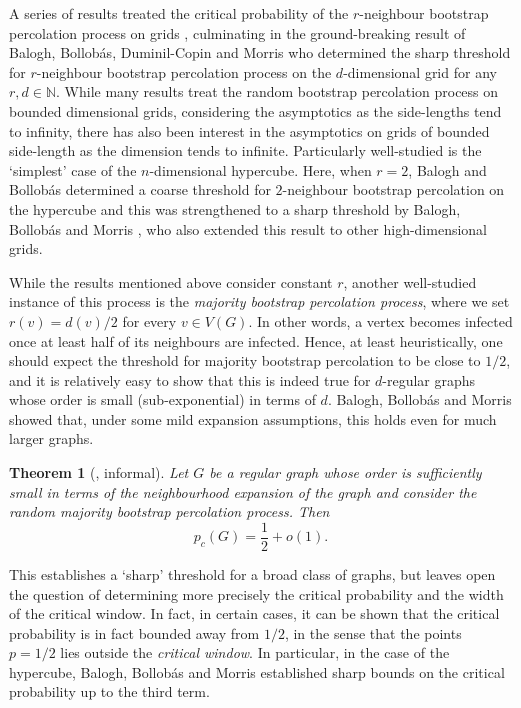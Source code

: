 \documentclass[reqno,a4paper,11pt]{amsart}
\newtheorem{theorem}{Theorem}[section]
\theoremstyle{definition}
\begin{document}
A series of results treated the critical probability of the $r$-neighbour bootstrap percolation process on grids \cite{AizenmanS2001Threshold,Balogh2003Sharp,Cerf1998Lattice3D,CerfManzo2002FinVol,GrHo08,HaMo19,holroyd2002sharp}, culminating in the ground-breaking result of Balogh, Bollobás, Duminil-Copin and Morris \cite{balogh2011Grid} who determined the sharp threshold for $r$-neighbour bootstrap percolation process on the $d$-dimensional grid for any $r, d \in \mathbb{N}$.
While many results treat the random bootstrap percolation process on bounded dimensional grids, considering the asymptotics as the side-lengths tend to infinity, there has also been interest in the asymptotics on grids of bounded side-length as the dimension tends to infinite.
Particularly well-studied is the `simplest' case of the $n$-dimensional hypercube.
Here, when $r=2$, Balogh and Bollobás \cite{BaBo06} determined a coarse threshold for $2$-neighbour bootstrap percolation on the hypercube and this was strengthened to a sharp threshold by Balogh, Bollobás and Morris \cite{BaBoMo2010HighDimGrid}, who also extended this result to other high-dimensional grids.

While the results mentioned above consider constant $r$, another well-studied instance of this process is the \emph{majority bootstrap percolation process}, where we set $r(v)=d(v)/2$ for every $v \in V(G)$.
In other words, a vertex becomes infected once at least half of its neighbours are infected.
Hence, at least heuristically, one should expect the threshold for majority bootstrap percolation to be close to $1/2$, and it is relatively easy to show that this is indeed true for $d$-regular graphs whose order is small (sub-exponential) in terms of $d$.
Balogh, Bollobás and Morris \cite{BaBoMo2009} showed that, under some mild expansion assumptions, this holds even for much larger graphs.

\begin{theorem}[{\cite[Theorem 2.2]{BaBoMo2009}}, informal]\label{thm:BaBoMogeneral}
  Let $G$ be a regular graph whose order is sufficiently small in terms of the neighbourhood expansion of the graph and consider the random majority bootstrap percolation process.
  Then
  \[
    p_c(G)=\frac{1}{2}+o(1).
  \]
\end{theorem}

This establishes a `sharp' threshold for a broad class of graphs, but leaves open the question of determining more precisely the critical probability and the width of the critical window.
In fact, in certain cases, it can be shown that the critical probability is in fact bounded away from $1/2$, in the sense that the points $p=1/2$ lies outside the \emph{critical window}.
In particular, in the case of the hypercube, Balogh, Bollob\'as and Morris \cite{BaBoMo2009} established sharp bounds on the critical probability up to the third term.
\end{document}
